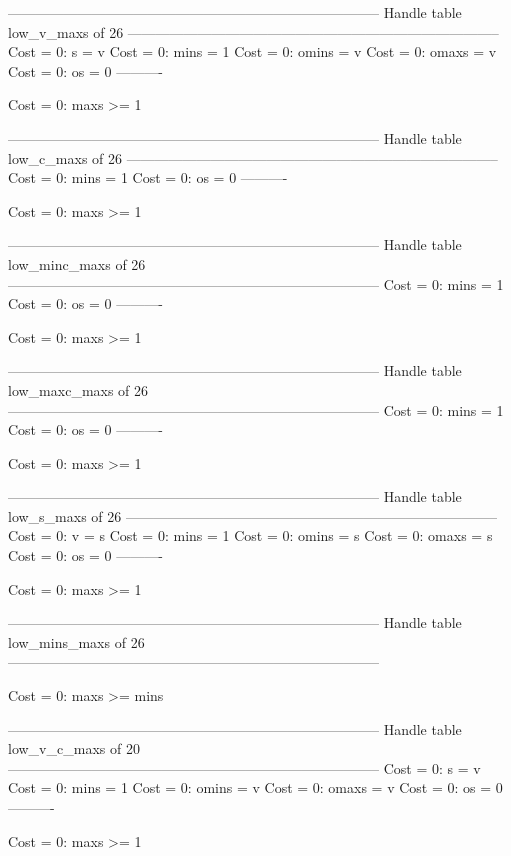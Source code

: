 --------------------------------------------------------------------------------
Handle table low_v_maxs of 26
--------------------------------------------------------------------------------
Cost =  0:  s     = v
Cost =  0:  mins  = 1
Cost =  0:  omins = v
Cost =  0:  omaxs = v
Cost =  0:  os    = 0
----------

Cost =  0:  maxs >= 1

--------------------------------------------------------------------------------
Handle table low_c_maxs of 26
--------------------------------------------------------------------------------
Cost =  0:  mins = 1
Cost =  0:  os   = 0
----------

Cost =  0:  maxs >= 1

--------------------------------------------------------------------------------
Handle table low_minc_maxs of 26
--------------------------------------------------------------------------------
Cost =  0:  mins = 1
Cost =  0:  os   = 0
----------

Cost =  0:  maxs >= 1

--------------------------------------------------------------------------------
Handle table low_maxc_maxs of 26
--------------------------------------------------------------------------------
Cost =  0:  mins = 1
Cost =  0:  os   = 0
----------

Cost =  0:  maxs >= 1

--------------------------------------------------------------------------------
Handle table low_s_maxs of 26
--------------------------------------------------------------------------------
Cost =  0:  v     = s
Cost =  0:  mins  = 1
Cost =  0:  omins = s
Cost =  0:  omaxs = s
Cost =  0:  os    = 0
----------

Cost =  0:  maxs >= 1

--------------------------------------------------------------------------------
Handle table low_mins_maxs of 26
--------------------------------------------------------------------------------

Cost =  0:  maxs >= mins

--------------------------------------------------------------------------------
Handle table low_v_c_maxs of 20
--------------------------------------------------------------------------------
Cost =  0:  s     = v
Cost =  0:  mins  = 1
Cost =  0:  omins = v
Cost =  0:  omaxs = v
Cost =  0:  os    = 0
----------

Cost =  0:  maxs >= 1

